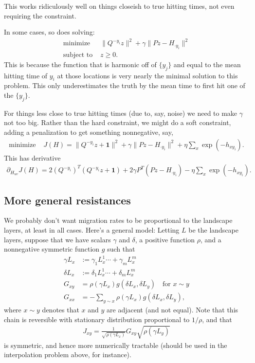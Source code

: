 \documentclass{article}
\newcommand{\bone}{\mathbf{1}}
\begin{document}
This works ridiculously well on things closeish to true hitting times,
not even requiring the constraint.

In some cases, so does solving:
\begin{align}
    \text{minimize } & \| Q^{-y_i} z \|^2 + \gamma \| Pz - H_{\cdot y_i} \|^2 \\
    \text{subject to } &  z \ge 0 .
\end{align}
This is because the function that is harmonic off of $\{y_j\}$
and equal to the mean hitting time of $y_i$ at those locations
is very nearly the minimal solution to this problem.
This only underestimates the truth by the mean time to first hit one of the $\{y_j\}$.

For things less close to true hitting times (due to, say, noise)
we need to 
make $\gamma$ not too big.
Rather than the hard constraint, we might do a soft constraint, 
adding a penalization to get something nonnegative, say,
\begin{align}
    \text{minimize } & J(H) = \| Q^{-y_i} z + \bone \|^2 + \gamma \| Pz - H_{\cdot y_i} \|^2 + \eta \sum_{x} \exp(-h_{xy_i}) .
\end{align}
This has derivative
\begin{align}
    \partial_{H_{uv}} J(H) =  2 (Q^{-y_i})^T ( Q^{-y_i} z + \bone ) + 2 \gamma P^T ( Pz - H_{\cdot y_i} ) - \eta \sum_x \exp(-h_{xy_i}) .
\end{align}



\subsection*{More general resistances}

We probably don't want migration rates to be proportional to the landscape layers,
at least in all cases.
Here's a general model:
Letting $L$ be the landscape layers,
suppose that we have scalars $\gamma$ and $\delta$, a positive function $\rho$, and a nonnegative symmetric function $g$ such that
\begin{align}
  \gamma L_x &:= \gamma_1 L^1_x \cdots + \gamma_m L^m_x  \\
  \delta L_x &:= \delta_1 L^1_x \cdots + \delta_m L^m_x  \\
  G_{xy} &= \rho( \gamma L_x ) g( \delta L_x, \delta L_y ) \quad \text{for $x \sim y$} \\
  G_{xx} &= - \sum_{y \sim x} \rho( \gamma L_x ) g( \delta L_x, \delta L_y ) ,
\end{align}
where $x \sim y$ denotes that $x$ and $y$ are adjacent (and not equal).
Note that this chain is reversible with stationary distribution proportional to $1/\rho$,
and that
\begin{align}
  J_{xy} = \frac{1}{\sqrt{\rho(\gamma L_x)}} G_{xy} \sqrt{ \rho(\gamma L_y) }
\end{align}
is symmetric, and hence more numerically tractable (should be used in the interpolation problem above, for instance).
\end{document}
